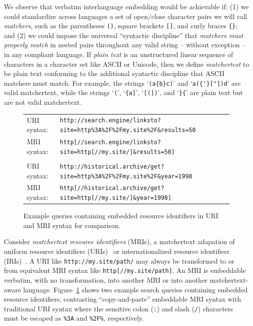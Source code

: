 We observe that verbatim interlanguage embedding would be achievable if:
(1)
we could standardize across languages
a set of open/close character pairs
we will call \emph{matchers},
such as the parentheses \verb|()|,
square brackets \verb|[]|,
and curly braces \verb|{}|;
and
(2) 
we could impose the universal ``syntactic discipline''
that \emph{matchers must properly match} in nested pairs
throughout any valid string -- without exception --
in any compliant language.
If \emph{plain text} is an unstructured linear sequence of characters
in a character set like ASCII or Unicode,
then we define \emph{matchertext} to be plain text
conforming to the additional syntactic discipline
that ASCII matchers must match.
For example, the strings `\verb|(a{b}c)|' and `\verb|a({'}["])d|'
are valid matchertext,
while the strings
`\verb|(|', `\verb|{a]|', `\verb|[(])|', and `\verb|}{|'
are plain text but are not valid matchertext.

\begin{figure}[t]
\begin{center}
\begin{small}
\begin{tabular}{ll}
URI syntax:	& \verb|http://search.engine/linksto?site=http%3A%2F%2Fmy.site%2F&results=50| \\
MRI syntax:	& \verb|http[//search.engine/linksto?site=http[//my.site/]&results=50]| \\
\\
URI syntax:	& \verb|http://historical.archive/get?site=http%3A%2F%2Fmy.site%2F&year=1998| \\
MRI syntax:	& \verb|http[//historical.archive/get?site=http[//my.site/]&year=1998]| \\
\end{tabular}
\end{small}
\end{center}
\caption{Example queries containing embedded resource identifiers
	in URI and MRI syntax for comparison.}
\label{fig:search-query}
\end{figure}

Consider \emph{matchertext resource identifiers} (MRIs),
a matchertext adapation of
uniform resource identifiers (URIs)~\cite{rfc3986} or
internationalized resource identifiers (IRIs)~\cite{rfc3987}.
A URI like \verb|http://my.site/path/|
may always be transformed to or from
equivalent MRI syntax like \verb|http[//my.site/path]|.
An MRI is embeddable verbatim, with no transformation,
into another MRI or into another matchertext-aware language.
Figure~\ref{fig:search-query} shows two example search queries
containing embedded resource identifiers,
contrasting ``copy-and-paste'' embeddable MRI syntax
with traditional URI syntax where the sensitive
colon (\verb|:|) and slash (\verb|/|) characters
must be escaped as \verb|%3A| and \verb|%2F%|, respectively.

